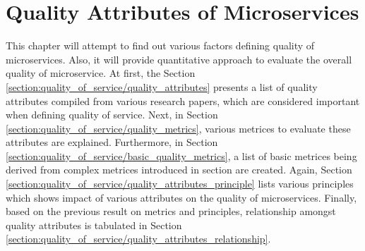 
\begin{comment}
comment from Manoj
- try to reference ISO/IEC 9126 for the quality attributes: refer to the slides sent by Manoj on Nov 02
- Also include the formula of the metrics and discuss about them and simplify them: refer to the slides sent by Manoj on Nov 02
- The quality attributes which can make more sense according to the priority to microservices: refer to the slides sent by Manoj on Nov 02
- Relationship between the quality attributes and their tradeoffs, what happens when we try to increase cohesion.. how it affect other attributes?
- create wiki page in the sebis page to document the literature review.

comment from Andrea
- mention about coupling created by calling same database directly by multiple microservice
use the formula to calculate quality metrics for the services at hybris to give an idea about good and bad service, the process of finding out good service at first and then using the quality metrics finding out the range of quality metrics, which can then be used to identify bad services
\end{comment}



\chapter{Quality Attributes of Microservices}\label{chapter:quality_of_service}
This chapter will attempt to find out various factors defining quality of microservices. Also, it will provide quantitative approach to evaluate the overall quality of microservice. At first, the Section \ref{section:quality_of_service/quality_attributes} presents a list of quality attributes compiled from various research papers, which are considered important when defining quality of service. Next, in Section \ref{section:quality_of_service/quality_metrics}, various metrices to evaluate these attributes are explained. Furthermore, in Section \ref{section:quality_of_service/basic_quality_metrics}, a list of basic metrices being derived from complex metrices introduced in section are created. Again, Section \ref{section:quality_of_service/quality_attributes_principle} lists various principles which shows impact of various attributes on the quality of microservices. Finally, based on the previous result on metrics and principles, relationship amongst quality attributes is tabulated in Section \ref{section:quality_of_service/quality_attributes_relationship}.

